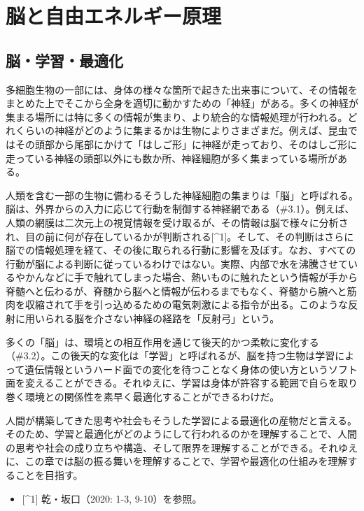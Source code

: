 \section{脳と自由エネルギー原理}\label{ux7b2cux4e09ux7ae0ux8133ux3068ux81eaux7531ux30a8ux30cdux30ebux30aeux30fcux539fux7406}

\subsection{脳・学習・最適化}\label{ux8133ux5b66ux7fd2ux6700ux9069ux5316}

多細胞生物の一部には、身体の様々な箇所で起きた出来事について、その情報をまとめた上でそこから全身を適切に動かすための「神経」がある。多くの神経が集まる場所には特に多くの情報が集まり、より統合的な情報処理が行われる。どれくらいの神経がどのように集まるかは生物によりさまざまだ。例えば、昆虫ではその頭部から尾部にかけて「はしご形」に神経が走っており、そのはしご形に走っている神経の頭部以外にも数か所、神経細胞が多く集まっている場所がある。

人類を含む一部の生物に備わるそうした神経細胞の集まりは「脳」と呼ばれる。脳は、外界からの入力に応じて行動を制御する神経網である（\#3.1）。例えば、人類の網膜は二次元上の視覚情報を受け取るが、その情報は脳で様々に分析され、目の前に何が存在しているかが判断される{[}\^{}1{]}。そして、その判断はさらに脳での情報処理を経て、その後に取られる行動に影響を及ぼす。なお、すべての行動が脳による判断に従っているわけではない。実際、内部で水を沸騰させているやかんなどに手で触れてしまった場合、熱いものに触れたという情報が手から脊髄へと伝わるが、脊髄から脳へと情報が伝わるまでもなく、脊髄から腕へと筋肉を収縮されて手を引っ込めるための電気刺激による指令が出る。このような反射に用いられる脳を介さない神経の経路を「反射弓」という。

多くの「脳」は、環境との相互作用を通じて後天的かつ柔軟に変化する（\#3.2）。この後天的な変化は「学習」と呼ばれるが、脳を持つ生物は学習によって遺伝情報というハード面での変化を待つことなく身体の使い方というソフト面を変えることができる。それゆえに、学習は身体が許容する範囲で自らを取り巻く環境との関係性を素早く最適化することができるわけだ。

人間が構築してきた思考や社会もそうした学習による最適化の産物だと言える。そのため、学習と最適化がどのようにして行われるのかを理解することで、人間の思考や社会の成り立ちや構造、そして限界を理解することができる。それゆえに、この章では脳の振る舞いを理解することで、学習や最適化の仕組みを理解することを目指す。

\begin{itemize}
\tightlist
\item
  {[}\^{}1{]} 乾・坂口（2020: 1-3, 9-10）を参照。
\end{itemize}

